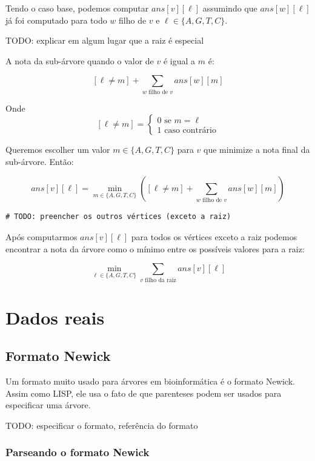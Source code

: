 \documentclass[11pt]{article}
\begin{document}
Tendo o caso base, podemos computar $ans[v][\ell]$ assumindo que $ans[w][\ell]$ já foi computado para
todo $w$ filho de $v$ e $\ell \in \{A, G, T, C\}$.

TODO: explicar em algum lugar que a raiz é especial

A nota da sub-árvore quando o valor de $v$ é igual a $m$ é:

\[[\ell \neq m] + \sum_{w \text{ filho de }v} ans[w][m]\]

Onde \[[\ell \neq m] =  \begin{cases} 0 \text{ se } m = \ell \\
                                     1 \text{ caso contrário}\end{cases}\]

Queremos escolher um valor $m \in \{A, G, T, C\}$ para $v$
que minimize a nota final da sub-árvore. Então:

\[ans[v][\ell] = \min_{m \in \{A, G, T, C\}}  \left([\ell \neq m] + \sum_{w \text{ filho de }v} ans[w][m]\right)\]

\begin{verbatim}
# TODO: preencher os outros vértices (exceto a raiz)
\end{verbatim}

Após computarmos $ans[v][\ell]$ para todos os vértices exceto a raiz
podemos encontrar a nota da árvore como o mínimo entre os possíveis
valores para a raiz:

\[ \min_{\ell \in \{A, G, T, C\}} \sum_{v \text{ filho da raiz}} ans[v][\ell]\]

\section{Dados reais}
\label{sec-3}

\subsection{Formato Newick}
\label{sec-3-1}

Um formato muito usado para árvores em bioinformática é o formato
Newick. Assim como LISP, ele usa o fato de que parenteses podem ser
usados para especificar uma árvore.

TODO: especificar o formato, referência do formato

\subsubsection{Parseando o formato Newick}
\label{sec-3-1-1}
\end{document}
